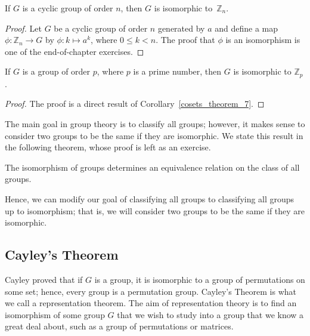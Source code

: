 \begin{theorem}\label{isomorph_theorem_3}
If $G$ is a cyclic group of order $n$, then $G$ is isomorphic to~${\mathbb Z}_n$.  
\end{theorem}
 
\begin{proof}
Let $G$ be a cyclic group of order $n$ generated by $a$ and define a map $\phi : {\mathbb Z}_n \rightarrow  G$ by $\phi : k \mapsto a^k$, where $0 \leq k < n$. The proof that $\phi$ is an isomorphism is one of the end-of-chapter exercises. 
\end{proof}

\begin{corollary}\label{isomorph_theorem_4}
If $G$ is a  group of order $p$, where $p$ is a prime number, then $G$ is isomorphic to ${\mathbb Z}_p$. 
\end{corollary}

\begin{proof}
The proof is a direct result of Corollary~\ref{cosets_theorem_7}.
\end{proof}
 
\medskip
 
The main goal in group theory is to classify all groups; however, it makes sense to consider two groups to be the same if they are isomorphic.  We state this result in the following theorem, whose proof is left as an exercise. 

\begin{theorem}\label{isomorph_theorem_5}
The isomorphism of groups determines an equivalence relation on the class of all groups. 
\end{theorem}
 
Hence, we can modify our goal of classifying all groups to classifying all groups {\bfi up to isomorphism}; that is, we will consider two groups to be the same if they are isomorphic.

 
\subsection*{Cayley's Theorem}

Cayley proved that if $G$ is a group, it is isomorphic to a group of permutations on some set; hence, every group is a permutation group.  Cayley's Theorem is what  we call a representation theorem.  The aim of representation theory is to find an isomorphism of some group $G$ that we wish to study into a group that we know a great deal about, such as a group of permutations or matrices.


